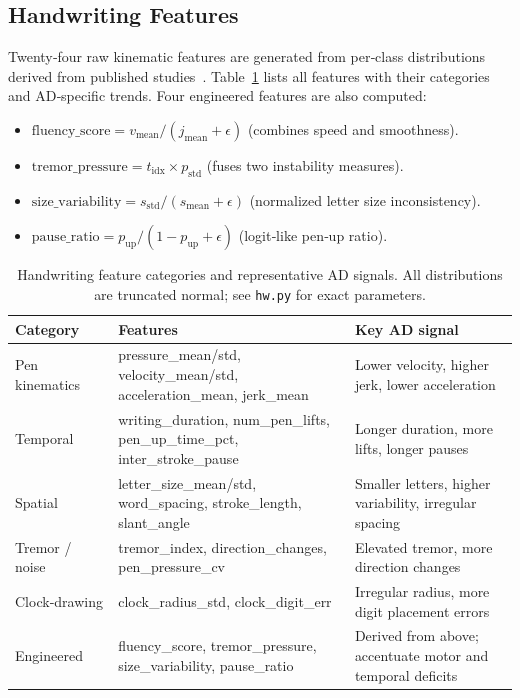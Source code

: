 \documentclass[conference]{IEEEtran}
\begin{document}
\subsection{Handwriting Features}
Twenty‑four raw kinematic features are generated from per‑class distributions derived from published studies~\cite{impedovo2019}. Table~\ref{tab:hw_features} lists all features with their categories and AD‑specific trends. Four engineered features are also computed:
\begin{itemize}[leftmargin=*, nosep]
  \item $\text{fluency\_score} = v_{\text{mean}} / (j_{\text{mean}} + \epsilon)$ (combines speed and smoothness).
  \item $\text{tremor\_pressure} = t_{\text{idx}} \times p_{\text{std}}$ (fuses two instability measures).
  \item $\text{size\_variability} = s_{\text{std}} / (s_{\text{mean}} + \epsilon)$ (normalized letter size inconsistency).
  \item $\text{pause\_ratio} = p_{\text{up}} / (1 - p_{\text{up}} + \epsilon)$ (logit‑like pen‑up ratio).
\end{itemize}

\begin{table}[htbp]
\centering
\caption{Handwriting feature categories and representative AD signals. All distributions are truncated normal; see \texttt{hw.py} for exact parameters.}
\label{tab:hw_features}
\begin{tabular}{@{}llp{}@{}}
\toprule
\textbf{Category} & \textbf{Features} & \textbf{Key AD signal} \\
\midrule
Pen kinematics & pressure\_mean/std, velocity\_mean/std, acceleration\_mean, jerk\_mean & Lower velocity, higher jerk, lower acceleration \\
Temporal & writing\_duration, num\_pen\_lifts, pen\_up\_time\_pct, inter\_stroke\_pause & Longer duration, more lifts, longer pauses \\
Spatial & letter\_size\_mean/std, word\_spacing, stroke\_length, slant\_angle & Smaller letters, higher variability, irregular spacing \\
Tremor / noise & tremor\_index, direction\_changes, pen\_pressure\_cv & Elevated tremor, more direction changes \\
Clock‑drawing & clock\_radius\_std, clock\_digit\_err & Irregular radius, more digit placement errors \\
Engineered & fluency\_score, tremor\_pressure, size\_variability, pause\_ratio & Derived from above; accentuate motor and temporal deficits \\
\bottomrule
\end{tabular}
\end{table}
\end{document}

